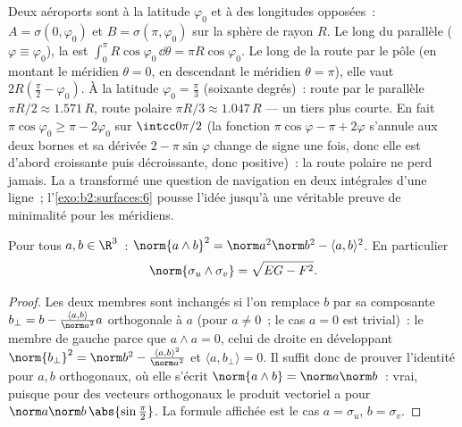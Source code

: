\begin{example}\label{ex:b2:surfaces:polarroute}
Deux aéroports sont à la latitude $\varphi_0$ et à des longitudes
opposées~: $A = \sigma(0, \varphi_0)$ et $B = \sigma(\pi,
\varphi_0)$ sur la sphère de rayon $R$. Le long du parallèle
($\varphi \equiv \varphi_0$), la  est
$\int_0^\pi R\cos\varphi_0\,\dd\theta = \pi R\cos\varphi_0$.
Le long de la route par le pôle (en montant le méridien $\theta = 0$,
en descendant le méridien $\theta = \pi$), elle vaut $2R(\frac\pi2 -
\varphi_0)$. À la latitude $\varphi_0 = \frac\pi3$ (soixante
degrés)~: route par le parallèle $\pi R/2 \approx 1.571\,R$, route
polaire $\pi R/3 \approx 1.047\,R$ --- un tiers plus courte. En fait
$\pi\cos\varphi_0 \geq \pi - 2\varphi_0$ sur
$\intcc0{\pi/2}$ (la fonction $\pi\cos\varphi - \pi +
2\varphi$ s'annule aux deux bornes et sa dérivée $2 -
\pi\sin\varphi$ change de signe une fois, donc elle est d'abord
croissante puis décroissante, donc positive)~: la route polaire
ne perd jamais. La  a transformé une
question de navigation en deux intégrales d'une ligne~;
l'\cref{exo:b2:surfaces:6} pousse l'idée jusqu'à une véritable
preuve de minimalité pour les méridiens.
\end{example}

\begin{lemma}\label{lem:b2:surfaces:lagrange}
Pour tous $a, b \in \R^3$~:
$\norm{a \wedge b}^2 = \norm a^2 \norm b^2 - \langle a, b\rangle^2$.
En particulier
\[
\norm{\sigma_u \wedge \sigma_v} = \sqrt{EG - F^2}.
\]
\end{lemma}

\begin{proof}
Les deux membres sont inchangés si l'on remplace $b$ par sa composante $b_\perp
= b - \frac{\langle a, b\rangle}{\norm a^2}a$ orthogonale à $a$
(pour $a \neq 0$~; le cas $a = 0$ est trivial)~: le membre de gauche
parce que $a \wedge a = 0$, celui de droite en développant $\norm
{b_\perp}^2 = \norm b^2 - \frac{\langle a,b\rangle^2}{\norm a^2}$
et $\langle a, b_\perp\rangle = 0$. Il suffit donc de prouver
l'identité pour $a, b$ orthogonaux, où elle s'écrit $\norm{a \wedge
b} = \norm a \norm b$~: vrai, puisque pour des vecteurs orthogonaux le
produit vectoriel a pour  $\norm a\norm b\,\abs{\sin\frac\pi2}$. La
formule affichée est le cas $a = \sigma_u$, $b = \sigma_v$.
\end{proof}

